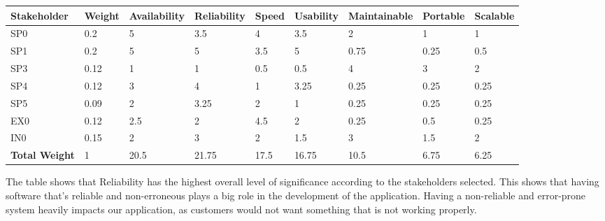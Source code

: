 \bigskip
\bigskip
\begin{tabularx}{\linewidth}{|X|X|X|X|X|X|X|X|X|} 
	\hline
	\textbf{Stakeholder}  & \textbf{Weight} & \textbf{Availability} & \textbf{Reliability} & \textbf{Speed} & \textbf{Usability} & \textbf{Maintainable} & \textbf{Portable} & \textbf{Scalable}  \\ 
	\hline
	SP0                   & 0.2             & 5                     & 3.5                  & 4              & 3.5                & 2                     & 1                 & 1                  \\ 
	\hline
	SP1                   & 0.2             & 5                     & 5                    & 3.5            & 5                  & 0.75                  & 0.25              & 0.5                \\ 
	\hline
	SP3                   & 0.12            & 1                     & 1                    & 0.5            & 0.5                & 4                     & 3                 & 2                  \\ 
	\hline
	SP4                   & 0.12            & 3                     & 4                    & 1              & 3.25               & 0.25                  & 0.25              & 0.25               \\ 
	\hline
	SP5                   & 0.09            & 2                     & 3.25                 & 2              & 1                  & 0.25                  & 0.25              & 0.25               \\ 
	\hline
	EX0                   & 0.12            & 2.5                   & 2                    & 4.5            & 2                  & 0.25                  & 0.5               & 0.25               \\ 
	\hline
	IN0                   & 0.15            & 2                     & 3                    & 2              & 1.5                & 3                     & 1.5               & 2                  \\ 
	\hline
	\textbf{Total Weight} & 1               & 20.5                  & 21.75                & 17.5           & 16.75              & 10.5                  & 6.75              & 6.25               \\
	\hline
\end{tabularx}
\bigskip

The table shows that Reliability has the highest overall level of significance according to the stakeholders selected. This shows that having software that's reliable and non-erroneous plays a big role in the development of the application. Having a non-reliable and error-prone system heavily impacts our application, as customers would not want something that is not working properly.